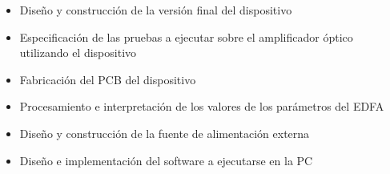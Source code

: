 \begin{itemize}
\item Diseño y construcción de la versión final del dispositivo
\item Especificación de las pruebas a ejecutar sobre el amplificador óptico utilizando el dispositivo
\item Fabricación del PCB del dispositivo
\item Procesamiento e interpretación de los valores de los parámetros del EDFA
\item Diseño y construcción de la fuente de alimentación externa
\item Diseño e implementación del software a ejecutarse en la PC
\end{itemize}


